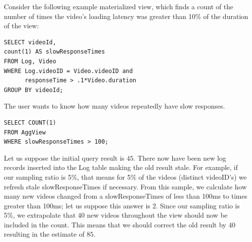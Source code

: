 Consider the following example materialized view, which finds a count of the number of times the video's loading latency was greater than 10\% of the duration of the view:

\vspace{0.5em}

\begin{lstlisting} 
SELECT videoId, 
count(1) AS slowResponseTimes 
FROM Log, Video
WHERE Log.videoID = Video.videoID and
	  responseTime > .1*Video.duration
GROUP BY videoId;
\end{lstlisting}

The user wants to know how many videos repeatedly have slow responses.
\begin{lstlisting} 
SELECT COUNT(1)
FROM AggView
WHERE slowResponseTimes > 100;
\end{lstlisting}
Let us suppose the initial query result is $45$.
There now have been new log records inserted into the Log table making the old result stale.
For example, if our sampling ratio is 5\%, that means for 5\% of the videos (distinct videoID's) we refresh stale slowResponseTimes if necessary.
From this sample, we calculate how many new videos changed from a slowResponseTimes of less than 100ms to times greater than 100ms; let us suppose this answer is $2$.
Since our sampling ratio is 5\%, we extrapolate that $40$ new videos throughout the view should now be included in the count.
This means that we should correct the old result by $40$ resulting in the estimate of $85$.